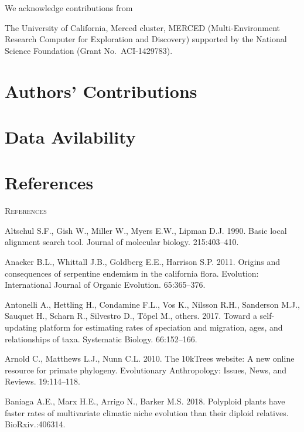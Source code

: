 \documentclass[]{article}
\begin{document}
We acknowledge contributions from

The University of California, Merced cluster, MERCED (Multi-Environment Research Computer for Exploration and Discovery) supported by the National Science Foundation (Grant No.~ACI-1429783).

\hypertarget{authors-contributions}{%
\section{Authors' Contributions}\label{authors-contributions}}

\hypertarget{data-avilability}{%
\section{Data Avilability}\label{data-avilability}}

\hypertarget{references}{%
\section{References}\label{references}}

\newpage
\begin{center}
\textsc{References}
\end{center}

\hypertarget{refs}{}
\leavevmode\hypertarget{ref-altschul1990basic}{}%
Altschul S.F., Gish W., Miller W., Myers E.W., Lipman D.J. 1990. Basic local alignment search tool. Journal of molecular biology. 215:403--410.

\leavevmode\hypertarget{ref-anacker2011origins}{}%
Anacker B.L., Whittall J.B., Goldberg E.E., Harrison S.P. 2011. Origins and consequences of serpentine endemism in the california flora. Evolution: International Journal of Organic Evolution. 65:365--376.

\leavevmode\hypertarget{ref-antonelli2017toward}{}%
Antonelli A., Hettling H., Condamine F.L., Vos K., Nilsson R.H., Sanderson M.J., Sauquet H., Scharn R., Silvestro D., Töpel M., others. 2017. Toward a self-updating platform for estimating rates of speciation and migration, ages, and relationships of taxa. Systematic Biology. 66:152--166.

\leavevmode\hypertarget{ref-arnold201010ktrees}{}%
Arnold C., Matthews L.J., Nunn C.L. 2010. The 10kTrees website: A new online resource for primate phylogeny. Evolutionary Anthropology: Issues, News, and Reviews. 19:114--118.

\leavevmode\hypertarget{ref-baniaga2018polyploid}{}%
Baniaga A.E., Marx H.E., Arrigo N., Barker M.S. 2018. Polyploid plants have faster rates of multivariate climatic niche evolution than their diploid relatives. BioRxiv.:406314.
\end{document}
